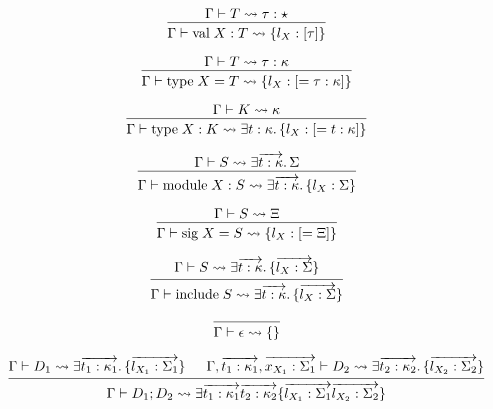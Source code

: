 \documentclass[lualatex,12pt,unicode]{article}
\begin{document}
\pagestyle{empty}

\[
    \begin{prooftree}
        \hypo{\Gamma \vdash T \rightsquigarrow \tau: \star}
        \infer1{\Gamma \vdash \mathrm{val}\; X: T \rightsquigarrow \{l_X: [\tau]\}}
    \end{prooftree}
\]

\[
    \begin{prooftree}
        \hypo{\Gamma \vdash T \rightsquigarrow \tau: \kappa}
        \infer1{\Gamma \vdash \mathrm{type}\; X = T \rightsquigarrow \{l_X: [= \tau: \kappa]\}}
    \end{prooftree}
\]

\[
    \begin{prooftree}
        \hypo{\Gamma \vdash K \rightsquigarrow \kappa}
        \infer1{\Gamma \vdash \mathrm{type}\; X: K \rightsquigarrow \exists t: \kappa\ldotp \{l_X: [= t: \kappa]\}}
    \end{prooftree}
\]

\[
    \begin{prooftree}
        \hypo{\Gamma \vdash S \rightsquigarrow \exists \overrightarrow{t: \kappa}\ldotp \Sigma}
        \infer1{\Gamma \vdash \mathrm{module}\; X: S \rightsquigarrow \exists \overrightarrow{t: \kappa}\ldotp \{l_X: \Sigma\}}
    \end{prooftree}
\]

\[
    \begin{prooftree}
        \hypo{\Gamma \vdash S \rightsquigarrow \Xi}
        \infer1{\Gamma \vdash \mathrm{sig}\; X = S \rightsquigarrow \{l_X: [= \Xi]\}}
    \end{prooftree}
\]

\[
    \begin{prooftree}
        \hypo{\Gamma \vdash S \rightsquigarrow \exists \overrightarrow{t: \kappa}\ldotp \{\overrightarrow{l_X: \Sigma}\}}
        \infer1{\Gamma \vdash \mathrm{include}\; S \rightsquigarrow \exists \overrightarrow{t: \kappa}\ldotp \{\overrightarrow{l_X: \Sigma}\}}
    \end{prooftree}
\]

\[
    \begin{prooftree}
        \infer0{\Gamma \vdash \epsilon \rightsquigarrow \{\}}
    \end{prooftree}
\]

\[
    \begin{prooftree}
        \hypo{\Gamma \vdash D_1 \rightsquigarrow \exists \overrightarrow{t_1: \kappa_1}\ldotp \{\overrightarrow{l_{X_1}: \Sigma_1}\}}
        \hypo{\Gamma, \overrightarrow{t_1: \kappa_1}, \overrightarrow{x_{X_1}: \Sigma_1} \vdash D_2 \rightsquigarrow \exists \overrightarrow{t_2: \kappa_2}\ldotp \{\overrightarrow{l_{X_2}: \Sigma_2}\}}
        \infer2{\Gamma \vdash D_1; D_2 \rightsquigarrow \exists \overrightarrow{t_1: \kappa_1} \overrightarrow{t_2: \kappa_2} \{\overrightarrow{l_{X_1}: \Sigma_1} \overrightarrow{l_{X_2}: \Sigma_2}\}}
    \end{prooftree}
\]
\end{document}
